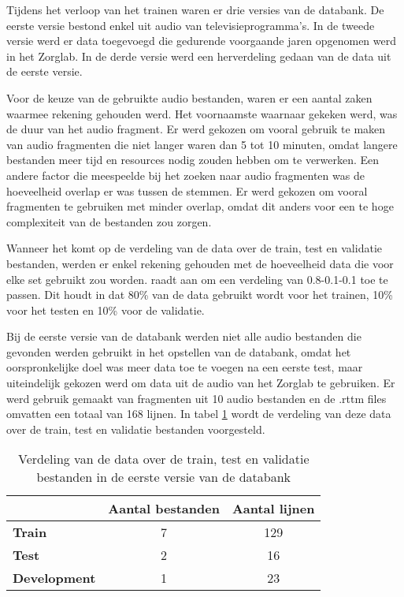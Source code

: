 Tijdens het verloop van het trainen waren er drie versies van de databank. De eerste versie bestond enkel uit audio van televisieprogramma's. In de tweede versie werd er data toegevoegd die gedurende voorgaande jaren opgenomen werd in het Zorglab. In de derde versie werd een herverdeling gedaan van de data uit de eerste versie.

Voor de keuze van de gebruikte audio bestanden, waren er een aantal zaken waarmee rekening gehouden werd. Het voornaamste waarnaar gekeken werd, was de duur van het audio fragment. Er werd gekozen om vooral gebruik te maken van audio fragmenten die niet langer waren dan 5 tot 10 minuten, omdat langere bestanden meer tijd en resources nodig zouden hebben om te verwerken. Een andere factor die meespeelde bij het zoeken naar audio fragmenten was de hoeveelheid overlap er was tussen de stemmen. Er werd gekozen om vooral fragmenten te gebruiken met minder overlap, omdat dit anders voor een te hoge complexiteit van de bestanden zou zorgen.

Wanneer het komt op de verdeling van de data over de train, test en validatie bestanden, werden er enkel rekening gehouden met de hoeveelheid data die voor elke set gebruikt zou worden. \textcite{BredinDatabase} raadt aan om een verdeling van 0.8-0.1-0.1 toe te passen. Dit houdt in dat 80\% van de data gebruikt wordt voor het trainen, 10\% voor het testen en 10\% voor de validatie.

Bij de eerste versie van de databank werden niet alle audio bestanden die gevonden werden gebruikt in het opstellen van de databank, omdat het oorspronkelijke doel was meer data toe te voegen na een eerste test, maar uiteindelijk gekozen werd om data uit de audio van het Zorglab te gebruiken. Er werd gebruik gemaakt van fragmenten uit 10 audio bestanden en de .rttm files omvatten een totaal van 168 lijnen. In tabel \ref{tbl:verdeling-v1} wordt de verdeling van deze data over de train, test en validatie bestanden voorgesteld.

\begin{table}[]
    \begin{tabular}{@{}lcc@{}}
        \toprule
                             & \multicolumn{1}{l}{\textbf{Aantal bestanden}} & \multicolumn{1}{l}{\textbf{Aantal lijnen}} \\ \midrule
        \textbf{Train}       & 7                                             & 129                                        \\
        \textbf{Test}        & 2                                             & 16                                         \\
        \textbf{Development} & 1                                             & 23                                         \\ \bottomrule
    \end{tabular}
    \caption[Verdeling data eerste versie databank]{\label{tbl:verdeling-v1}Verdeling van de data over de train, test en validatie bestanden in de eerste versie van de databank}
\end{table}

